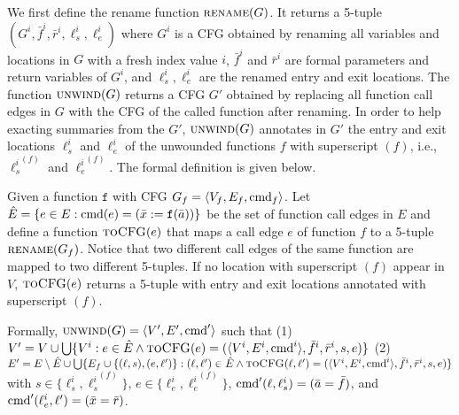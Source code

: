 We first define the rename function $\textsc{rename}(G)$. It returns a 5-tuple $(G^i, \bar{f}^i, \bar{r}^i,\ell_s^i,\ell_e^i)$ where $G^i$ is a CFG obtained by renaming all variables and locations in $G$ with a fresh index value $i$, $\bar{f}^i$ and $\bar{r}^i$ are formal parameters and return variables of $G^i$, and $\ell_s^i,\ell_e^i$ are the renamed entry and exit locations. The function $\textsc{unwind}(G)$ returns a CFG $G'$ obtained by replacing all function call edges in $G$ with the CFG of the called function after renaming. In order to help exacting summaries from the $G'$, $\textsc{unwind}(G)$ annotates in $G'$ the entry and exit locations ${\ell_s^i}$ and ${\ell_e^i}$ of the unwounded functions $f$ with superscript $(f)$, i.e., ${\ell_s^i}^{(f)}$ and ${\ell_e^i}^{(f)}$. The formal definition is given below.

Given a function $\mathtt{f}$ with CFG $G_f=\langle
V_f, E_f,\textmd{cmd}_f \rangle$.
Let $\hat{E} =\{e\in E: \textmd{cmd} (e)= (\bar{x}:=\mathtt{f}(\bar{a}))\}$ be the set of function call edges in $E$ and define a function $\textsc{toCFG}(e)$ that maps a call edge $e$ of function $f$ to a 5-tuple $\textsc{rename}(G_f)$. Notice that two different call edges of the same function are mapped to two different 5-tuples. If no location with superscript $(f)$ appear in $V$, $\textsc{toCFG}(e)$ returns a 5-tuple with entry and exit locations annotated with superscript $(f)$.

Formally, $\textsc{unwind}(G) = \langle V', E',\textmd{cmd}' \rangle$ such that (1) $V' = V\cup \bigcup\{V^i: e\in \hat{E} \wedge \textsc{toCFG}(e)= (\langle V^i, E^i,\textmd{cmd}^i \rangle, \bar{f}^i, \bar{r}^i,s,e) \}$ (2) $E'= E \setminus \hat{E} \cup \bigcup\{E_f\cup\{(\ell, s),(e, \ell')\}: (\ell, \ell')\in \hat{E} \wedge \textsc{toCFG}(\ell, \ell')= (\langle V^i, E^i,\textmd{cmd}^i \rangle, \bar{f}^i, \bar{r}^i,s,e) \}$ with $s\in \{\ell_s^i,{\ell_s^i}^{(f)}\}$, $e\in \{\ell_e^i,{\ell_e^i}^{(f)}\}$, $\textmd{cmd}' (\ell, {\ell_s^i}) = (\bar{a}=\bar{f})$, and $\textmd{cmd}' ({\ell_e^i}, \ell') = (\bar{x}=\bar{r})$.






